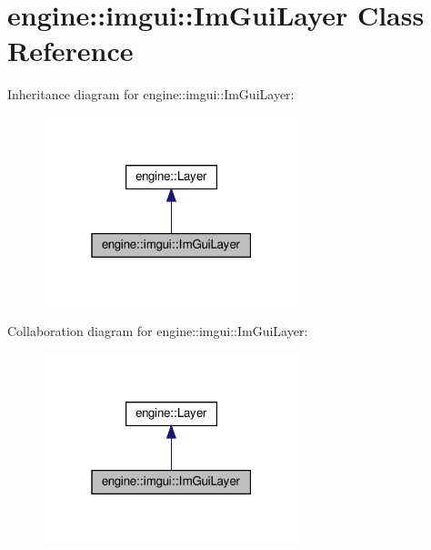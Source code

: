 \hypertarget{classengine_1_1imgui_1_1ImGuiLayer}{}\section{engine\+:\+:imgui\+:\+:Im\+Gui\+Layer Class Reference}
\label{classengine_1_1imgui_1_1ImGuiLayer}


Inheritance diagram for engine\+:\+:imgui\+:\+:Im\+Gui\+Layer\+:\nopagebreak
\begin{figure}[H]
\begin{center}
\leavevmode
\includegraphics[width=211pt]{classengine_1_1imgui_1_1ImGuiLayer__inherit__graph}
\end{center}
\end{figure}


Collaboration diagram for engine\+:\+:imgui\+:\+:Im\+Gui\+Layer\+:\nopagebreak
\begin{figure}[H]
\begin{center}
\leavevmode
\includegraphics[width=211pt]{classengine_1_1imgui_1_1ImGuiLayer__coll__graph}
\end{center}
\end{figure}
